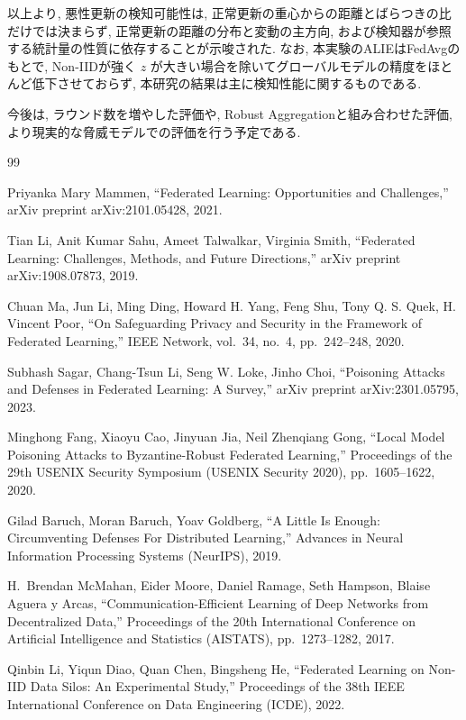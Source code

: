\documentclass[a4j, twocolumn, dvipdfmx]{jsarticle}
\begin{document}
以上より, 悪性更新の検知可能性は, 正常更新の重心からの距離とばらつきの比だけでは決まらず, 正常更新の距離の分布と変動の主方向, および検知器が参照する統計量の性質に依存することが示唆された. なお, 本実験のALIEはFedAvgのもとで, Non-IIDが強く $z$ が大きい場合を除いてグローバルモデルの精度をほとんど低下させておらず, 本研究の結果は主に検知性能に関するものである.

今後は, ラウンド数を増やした評価や, Robust Aggregationと組み合わせた評価, より現実的な脅威モデルでの評価を行う予定である.

\begin{thebibliography}{99}

Priyanka Mary Mammen,
``Federated Learning: Opportunities and Challenges,''
arXiv preprint arXiv:2101.05428, 2021.

Tian Li, Anit Kumar Sahu, Ameet Talwalkar, Virginia Smith,
``Federated Learning: Challenges, Methods, and Future Directions,''
arXiv preprint arXiv:1908.07873, 2019.

Chuan Ma, Jun Li, Ming Ding, Howard H. Yang, Feng Shu, Tony Q. S. Quek, H. Vincent Poor,
``On Safeguarding Privacy and Security in the Framework of Federated Learning,''
IEEE Network, vol.~34, no.~4, pp.~242--248, 2020.

Subhash Sagar, Chang-Tsun Li, Seng W. Loke, Jinho Choi,
``Poisoning Attacks and Defenses in Federated Learning: A Survey,''
arXiv preprint arXiv:2301.05795, 2023.

Minghong Fang, Xiaoyu Cao, Jinyuan Jia, Neil Zhenqiang Gong,
``Local Model Poisoning Attacks to Byzantine-Robust Federated Learning,''
Proceedings of the 29th USENIX Security Symposium (USENIX Security 2020),
pp.~1605--1622, 2020.

Gilad Baruch, Moran Baruch, Yoav Goldberg,
``A Little Is Enough: Circumventing Defenses For Distributed Learning,''
Advances in Neural Information Processing Systems (NeurIPS), 2019.

H.~Brendan McMahan, Eider Moore, Daniel Ramage, Seth Hampson, Blaise Aguera y Arcas,
``Communication-Efficient Learning of Deep Networks from Decentralized Data,''
Proceedings of the 20th International Conference on Artificial Intelligence and Statistics (AISTATS),
pp.~1273--1282, 2017.

Qinbin Li, Yiqun Diao, Quan Chen, Bingsheng He,
``Federated Learning on Non-IID Data Silos: An Experimental Study,''
Proceedings of the 38th IEEE International Conference on Data Engineering (ICDE), 2022.


\end{thebibliography}
\end{document}
